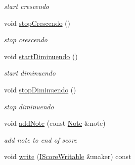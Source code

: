 \begin{DoxyCompactItemize}
\begin{DoxyCompactList}\small\item\em start crescendo \end{DoxyCompactList}\item 
\hypertarget{classsinsy_1_1SinsyImpl_aae477f82fd122c8182f58eee6aa4850c}{void \hyperlink{classsinsy_1_1SinsyImpl_aae477f82fd122c8182f58eee6aa4850c}{stop\-Crescendo} ()}\label{classsinsy_1_1SinsyImpl_aae477f82fd122c8182f58eee6aa4850c}

\begin{DoxyCompactList}\small\item\em stop crescendo \end{DoxyCompactList}\item 
\hypertarget{classsinsy_1_1SinsyImpl_ae691d4395d2534246111c044110290f1}{void \hyperlink{classsinsy_1_1SinsyImpl_ae691d4395d2534246111c044110290f1}{start\-Diminuendo} ()}\label{classsinsy_1_1SinsyImpl_ae691d4395d2534246111c044110290f1}

\begin{DoxyCompactList}\small\item\em start diminuendo \end{DoxyCompactList}\item 
\hypertarget{classsinsy_1_1SinsyImpl_ac46c1d8a384f77ef76ba9ec374515515}{void \hyperlink{classsinsy_1_1SinsyImpl_ac46c1d8a384f77ef76ba9ec374515515}{stop\-Diminuendo} ()}\label{classsinsy_1_1SinsyImpl_ac46c1d8a384f77ef76ba9ec374515515}

\begin{DoxyCompactList}\small\item\em stop diminuendo \end{DoxyCompactList}\item 
\hypertarget{classsinsy_1_1SinsyImpl_aebc0e336dd09e5418cad4df9066dcd3e}{void \hyperlink{classsinsy_1_1SinsyImpl_aebc0e336dd09e5418cad4df9066dcd3e}{add\-Note} (const \hyperlink{classsinsy_1_1Note}{\-Note} \&note)}\label{classsinsy_1_1SinsyImpl_aebc0e336dd09e5418cad4df9066dcd3e}

\begin{DoxyCompactList}\small\item\em add note to end of score \end{DoxyCompactList}\item 
\hypertarget{classsinsy_1_1SinsyImpl_a845c7c596b66036f2d335b738609751b}{void \hyperlink{classsinsy_1_1SinsyImpl_a845c7c596b66036f2d335b738609751b}{write} (\hyperlink{classsinsy_1_1IScoreWritable}{\-I\-Score\-Writable} \&maker) const }\label{classsinsy_1_1SinsyImpl_a845c7c596b66036f2d335b738609751b}


\end{DoxyCompactItemize}
